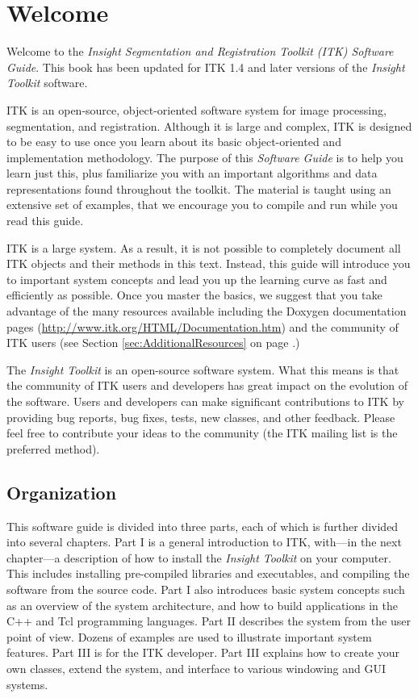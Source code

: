 \chapter{Welcome}
\label{chapter:Introduction}

Welcome to the \emph{Insight Segmentation and Registration Toolkit (ITK)
Software Guide}. This book has been updated for ITK 1.4 and later versions of
the \emph{Insight Toolkit} software.

ITK is an open-source, object-oriented software system for image processing,
segmentation, and registration.  Although it is large and complex, ITK is
designed to be easy to use once you learn about its basic object-oriented and
implementation methodology. The purpose of this \emph{Software Guide} is
to help you learn just this, plus familiarize you with an important
algorithms and data representations found throughout the toolkit. The material
is taught using an extensive set of examples, that we encourage you to compile
and run while you read this guide.

ITK is a large system. As a result, it is not possible to completely document
all ITK objects and their methods in this text. Instead, this guide will
introduce you to important system concepts and lead you up the learning curve
as fast and efficiently as possible. Once you master the basics, we suggest
that you take advantage of the many resources available including the Doxygen
documentation pages (\url{http://www.itk.org/HTML/Documentation.htm}) and
the community of ITK users (see Section \ref{sec:AdditionalResources} on page 
\pageref{sec:AdditionalResources}.)

The \emph{Insight Toolkit} is an open-source software system. What this means
is that the community of ITK users and developers has great impact on the
evolution of the software. Users and developers can make significant
contributions to ITK by providing bug reports, bug fixes, tests, new classes,
and other feedback. Please feel free to contribute your ideas to the
community (the ITK mailing list is the preferred method).

\section{Organization}
\label{sec:Organization}

This software guide is divided into three parts, each of which is further
divided into several chapters. Part I is a general introduction to ITK,
with---in the next chapter---a description of how to install the \emph{Insight
Toolkit} on your computer. This includes installing pre-compiled libraries and
executables, and compiling the software from the source code. Part I also
introduces basic system concepts such as an overview of the system
architecture, and how to build applications in the C++ and Tcl programming
languages. Part II describes the system from the user point of view. Dozens
of examples are used to illustrate important system features. Part III is for
the ITK developer. Part III explains how to create your own classes, extend
the system, and interface to various windowing and GUI systems.


